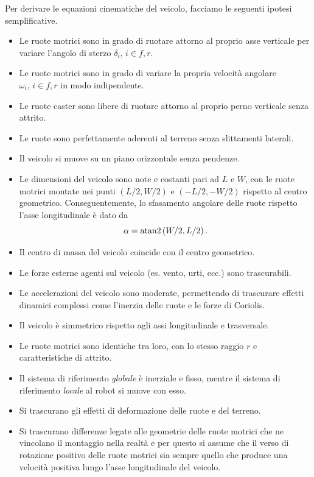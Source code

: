 Per derivare le equazioni cinematiche del veicolo, facciamo le seguenti ipotesi semplificative.
\begin{itemize}
    \item Le ruote motrici sono in grado di ruotare attorno al proprio asse verticale per variare l'angolo di sterzo $\delta_i,\, i\in{f,r}$.
    \item Le ruote motrici sono in grado di variare la propria velocità angolare $\omega_i,\, i\in{f,r}$ in modo indipendente.
    \item Le ruote caster sono libere di ruotare attorno al proprio perno verticale senza attrito.
    \item Le ruote sono perfettamente aderenti al terreno senza slittamenti laterali.
    \item Il veicolo si muove su un piano orizzontale senza pendenze.
    \item Le dimensioni del veicolo sono note e costanti pari ad $L$ e $W$, con le ruote motrici montate nei punti $ (L/2, W/2) $ e $ (-L/2, -W/2) $ rispetto al centro geometrico. Conseguentemente, lo sfasamento angolare delle ruote rispetto l'asse longitudinale è dato da
          \begin{equation}\label{eq:alpha}
              \alpha = \operatorname{atan2}\left(W/2,L/2\right).
          \end{equation}
    \item Il centro di massa del veicolo coincide con il centro geometrico.
    \item Le forze esterne agenti sul veicolo (es. vento, urti, ecc.) sono trascurabili.
    \item Le accelerazioni del veicolo sono moderate, permettendo di trascurare effetti dinamici complessi come l'inerzia delle ruote e le forze di Coriolis.
    \item Il veicolo è simmetrico rispetto agli assi longitudinale e trasversale.
    \item Le ruote motrici sono identiche tra loro, con lo stesso raggio $r$ e caratteristiche di attrito.
    \item Il sistema di riferimento \textit{globale} è inerziale e fisso, mentre il sistema di riferimento \textit{locale} al robot si muove con esso.
    \item Si trascurano gli effetti di deformazione delle ruote e del terreno.
    \item Si trascurano differenze legate alle geometrie delle ruote motrici che ne vincolano il montaggio nella realtà e per questo si assume che il verso di rotazione positivo delle ruote motrici sia sempre quello che produce una velocità positiva lungo l'asse longitudinale del veicolo.
\end{itemize}

